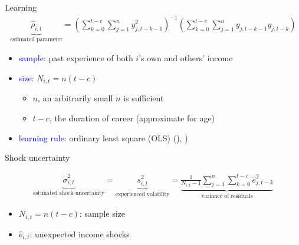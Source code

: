 \documentclass{beamer}
\begin{document}
\begin{frame}{Learning}
\begin{eqnarray}
\underbrace{\hat \rho_{i,t}}_{\text{estimated parameter}}= (\sum^{t-c}_{k=0}\sum^{n}_{j=1}y^2_{j,t-k-1})^{-1}(\sum^{t-c}_{k=0}\sum^{n}_{j=1}y_{j,t-k-1}y_{j,t-k})
\end{eqnarray}

	\begin{itemize}
		\item \textcolor{blue}{sample}: past experience of both $i$'s own and others' income
		\item \textcolor{blue}{size}:   $N_{i,t} = n (t-c)$
		\begin{itemize}
		\item $n$, an arbitrarily small $n$ is sufficient
		 \item $t-c$, the duration of career (approximate for age)   
		 \end{itemize}
		\item \textcolor{blue}{learning rule}: ordinary least square (OLS) (\cite{evans2012learning}), \cite{malmendier2015learning})
	\end{itemize} 
\end{frame}

\begin{frame}{Shock uncertainty}
	
	
\begin{eqnarray}
\underbrace{\tilde{\sigma}^2_{i,t}}_{\text{estimated shock uncertainty}}=\underbrace{ s^2_{i,t}}_{\text{experienced volatility}} =\underbrace{\frac{1}{N_{i,t}-1} \sum^{n}_{j=1}\sum^{t-c}_{k=0} \hat e_{j,t-k}^2}_{\text{variance of residuals}}
\end{eqnarray}

	\begin{itemize}
	\item $N_{i,t} = n (t-c)$: sample size
	\item $\hat e_{i,t}$: unexpected income shocks 
\end{itemize} 
\end{frame}
\end{document}
